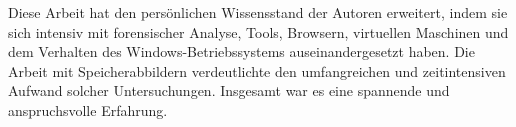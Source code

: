 Diese Arbeit hat den persönlichen Wissensstand der Autoren erweitert, indem sie sich intensiv mit forensischer Analyse, Tools, Browsern, virtuellen Maschinen und dem Verhalten des Windows-Betriebssystems auseinandergesetzt haben. Die Arbeit mit Speicherabbildern verdeutlichte den umfangreichen und zeitintensiven Aufwand solcher Untersuchungen. Insgesamt war es eine spannende und anspruchsvolle Erfahrung.
%
%
%

